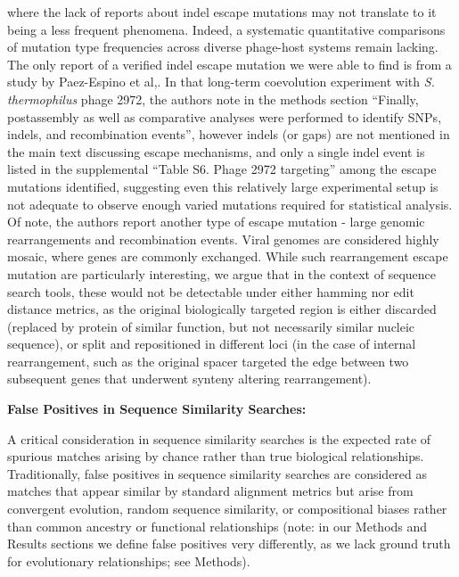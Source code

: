 \documentclass[
]{article}
\begin{document}
where the lack of reports about indel escape mutations may not translate
to it being a less frequent phenomena. Indeed, a systematic quantitative
comparisons of mutation type frequencies across diverse phage-host
systems remain lacking. The only report of a verified indel escape
mutation we were able to find is from a study by Paez-Espino et
al,\autocite{Paez_Espino_2015}. In that long-term coevolution experiment
with \emph{S. thermophilus} phage 2972, the authors note in the methods
section ``Finally, postassembly as well as comparative analyses were
performed to identify SNPs, indels, and recombination events'', however
indels (or gaps) are not mentioned in the main text discussing escape
mechanisms, and only a single indel event is listed in the supplemental
``Table S6. Phage 2972 targeting'' among the escape mutations
identified, suggesting even this relatively large experimental setup is
not adequate to observe enough varied mutations required for statistical
analysis. Of note, the authors report another type of escape mutation -
large genomic rearrangements and recombination events. Viral genomes are
considered highly mosaic, where genes are commonly
exchanged\autocite{Hatfull_2011_bacteriophages_genomes,Kupczok_2018_phage_genome_evolution}.
While such rearrangement escape mutation are particularly interesting,
we argue that in the context of sequence search tools, these would not
be detectable under either hamming nor edit distance metrics, as the
original biologically targeted region is either discarded (replaced by
protein of similar function, but not necessarily similar nucleic
sequence), or split and repositioned in different loci (in the case of
internal rearrangement, such as the original spacer targeted the edge
between two subsequent genes that underwent synteny altering
rearrangement).

\textbf{False Positives in Sequence Similarity Searches:}

A critical consideration in sequence similarity searches is the expected
rate of spurious matches arising by chance rather than true biological
relationships. Traditionally, false positives in sequence similarity
searches are considered as matches that appear similar by standard
alignment metrics but arise from convergent evolution, random sequence
similarity, or compositional biases rather than common ancestry or
functional relationships (note: in our Methods and Results sections we
define false positives very differently, as we lack ground truth for
evolutionary relationships; see Methods).
\end{document}
